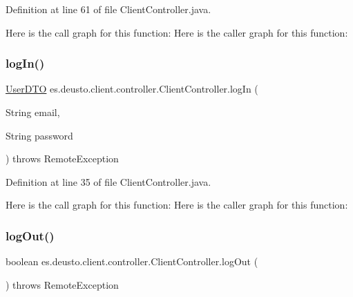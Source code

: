 Definition at line 61 of file Client\+Controller.\+java.

Here is the call graph for this function\+:
Here is the caller graph for this function\+:
\mbox{\label{classes_1_1deusto_1_1client_1_1controller_1_1_client_controller_a075c2e627be920454324dacbbc72295c}} 
\subsubsection{\texorpdfstring{logIn()}{logIn()}}
{\footnotesize\ttfamily \mbox{\hyperlink{classes_1_1deusto_1_1server_1_1data_1_1_user_d_t_o}{User\+D\+TO}} es.\+deusto.\+client.\+controller.\+Client\+Controller.\+log\+In (\begin{DoxyParamCaption}\item[{String}]{email,  }\item[{String}]{password }\end{DoxyParamCaption}) throws Remote\+Exception}



Definition at line 35 of file Client\+Controller.\+java.

Here is the call graph for this function\+:
Here is the caller graph for this function\+:
\mbox{\label{classes_1_1deusto_1_1client_1_1controller_1_1_client_controller_a9379da9c24d71d3ebafaa44e0f858340}} 
\subsubsection{\texorpdfstring{logOut()}{logOut()}}
{\footnotesize\ttfamily boolean es.\+deusto.\+client.\+controller.\+Client\+Controller.\+log\+Out (\begin{DoxyParamCaption}{ }\end{DoxyParamCaption}) throws Remote\+Exception}




